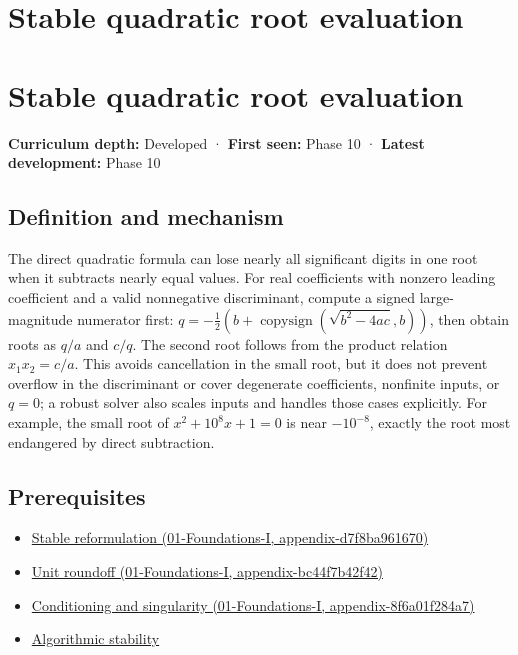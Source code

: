 \hypertarget{appendix-b9afba7f63e5}{}
\section*{Stable quadratic root evaluation}
\section{Stable quadratic root evaluation}\label{appendix-b9afba7f63e5-stable-quadratic-root-evaluation}

\textbf{Curriculum depth:} Developed · \textbf{First seen:} Phase 10 · \textbf{Latest development:} Phase 10

\subsection{Definition and mechanism}\label{appendix-b9afba7f63e5-definition-and-mechanism}

The direct quadratic formula can lose nearly all significant digits in one root when it subtracts nearly equal values. For real coefficients with nonzero leading coefficient and a valid nonnegative discriminant, compute a signed large-magnitude numerator first: \(q=-\frac12(b+\operatorname{copysign}(\sqrt{b^2-4ac},b))\), then obtain roots as \(q/a\) and \(c/q\). The second root follows from the product relation \(x_1x_2=c/a\). This avoids cancellation in the small root, but it does not prevent overflow in the discriminant or cover degenerate coefficients, nonfinite inputs, or \(q=0\); a robust solver also scales inputs and handles those cases explicitly. For example, the small root of \(x^2+10^8x+1=0\) is near \(-10^{-8}\), exactly the root most endangered by direct subtraction.

\subsection{Prerequisites}\label{appendix-b9afba7f63e5-prerequisites}

\begin{itemize}
\tightlist
\item
  \href{../01-Foundations-I/main.pdf\#nameddest=appendix-d7f8ba961670}{Stable reformulation (01-Foundations-I, appendix-d7f8ba961670)}
\item
  \href{../01-Foundations-I/main.pdf\#nameddest=appendix-bc44f7b42f42}{Unit roundoff (01-Foundations-I, appendix-bc44f7b42f42)}
\item
  \href{../01-Foundations-I/main.pdf\#nameddest=appendix-8f6a01f284a7}{Conditioning and singularity (01-Foundations-I, appendix-8f6a01f284a7)}
\item
  \hyperref[appendix-aa2bf0d79639]{Algorithmic stability}
\end{itemize}

